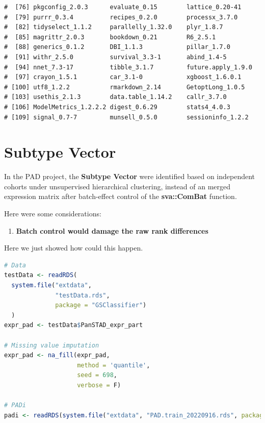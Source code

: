 \documentclass[
  12pt,
]{book}
\providecommand{\tightlist}{%
  \setlength{\itemsep}{0pt}\setlength{\parskip}{0pt}}
\begin{document}
\begin{lstlisting}
#  [76] pkgconfig_2.0.3      evaluate_0.15        lattice_0.20-41     
#  [79] purrr_0.3.4          recipes_0.2.0        processx_3.7.0      
#  [82] tidyselect_1.1.2     parallelly_1.32.0    plyr_1.8.7          
#  [85] magrittr_2.0.3       bookdown_0.21        R6_2.5.1            
#  [88] generics_0.1.2       DBI_1.1.3            pillar_1.7.0        
#  [91] withr_2.5.0          survival_3.3-1       abind_1.4-5         
#  [94] nnet_7.3-17          tibble_3.1.7         future.apply_1.9.0  
#  [97] crayon_1.5.1         car_3.1-0            xgboost_1.6.0.1     
# [100] utf8_1.2.2           rmarkdown_2.14       GetoptLong_1.0.5    
# [103] usethis_2.1.3        data.table_1.14.2    callr_3.7.0         
# [106] ModelMetrics_1.2.2.2 digest_0.6.29        stats4_4.0.3        
# [109] signal_0.7-7         munsell_0.5.0        sessioninfo_1.2.2
\end{lstlisting}

\hypertarget{subtype-vector}{%
\section{Subtype Vector}\label{subtype-vector}}

In the PAD project, the \textbf{Subtype Vector} were identified based on independent cohorts under unsupervised hierarchical clustering, instead of an merged expression matrix after batch-effect control of the \textbf{sva::ComBat} function.

Here were some considerations:

\begin{enumerate}
\def\labelenumi{\arabic{enumi}.}
\tightlist
\item
  \textbf{Batch control would damage the raw rank differences}
\end{enumerate}

Here we just showed how could this happen.

\begin{lstlisting}[language=R]
# Data
testData <- readRDS(
  system.file("extdata", 
              "testData.rds", 
              package = "GSClassifier")
  )
expr_pad <- testData$PanSTAD_expr_part

# Missing value imputation
expr_pad <- na_fill(expr_pad, 
                    method = 'quantile', 
                    seed = 698,
                    verbose = F)

# PADi
padi <- readRDS(system.file("extdata", "PAD.train_20220916.rds", package = "GSClassifier")) 
\end{lstlisting}
\end{document}
